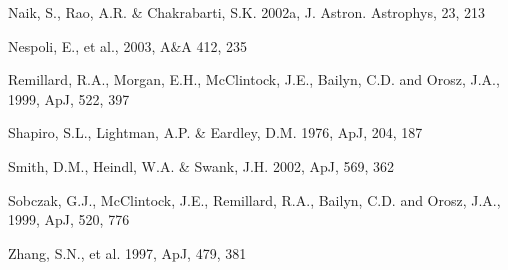 \documentclass[referee]{cjaa}           %
\begin{document}
\begin{thebibliography}{99}
\bibitem[]{}
Naik, S., Rao, A.R. \& Chakrabarti, S.K. 2002a, J. Astron. Astrophys, 23, 213 

\bibitem[]{}
Nespoli, E., et al., 2003,  A\&A 412, 235 

\bibitem[]{}
Remillard, R.A., Morgan, E.H., McClintock, J.E., Bailyn, C.D. and Orosz, J.A.,
1999, ApJ, 522, 397

\bibitem[]{}
Shapiro, S.L., Lightman, A.P. \& Eardley, D.M. 1976, ApJ, 204, 187 

\bibitem[]{} 
Smith, D.M., Heindl, W.A. \& Swank, J.H. 2002, ApJ, 569, 362

\bibitem[]{}
Sobczak, G.J., McClintock, J.E., Remillard, R.A., Bailyn, C.D. and Orosz, J.A.,
1999, ApJ, 520, 776

\bibitem[]{}
Zhang, S.N., et al. 1997, ApJ, 479, 381

\end{thebibliography}

\label{lastpage}
\end{document}
